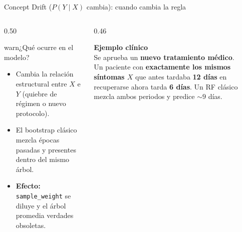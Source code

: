 \documentclass[aspectratio=169,11pt,table]{beamer}
\begin{document}
\begin{frame}{Concept Drift ($P(Y \mid X)$ cambia): cuando cambia la regla}
\begin{columns}[T,onlytextwidth]
\begin{column}{0.50\textwidth}
\begin{contrastbox}{warn}{¿Qué ocurre en el modelo?}
\footnotesize
\begin{itemize}
  \item Cambia la relación estructural entre $X$ e $Y$ (quiebre de régimen o nuevo protocolo).
  \item El bootstrap clásico mezcla épocas pasadas y presentes dentro del mismo árbol.
  \item \textbf{Efecto:} \texttt{sample\_weight} se diluye y el árbol promedia verdades obsoletas.
\end{itemize}
\end{contrastbox}
\end{column}
\begin{column}{0.46\textwidth}
\begin{keybox}
\footnotesize
\textbf{Ejemplo clínico}\\[0.10cm]
Se aprueba un \textbf{nuevo tratamiento médico}.\\[0.10cm]
Un paciente con \textbf{exactamente los mismos síntomas $X$} que antes tardaba \textbf{12 días} en recuperarse ahora tarda \textbf{6 días}. Un RF clásico mezcla ambos periodos y predice $\sim 9$ días.
\end{keybox}
\end{column}
\end{columns}
\end{frame}
\end{document}
